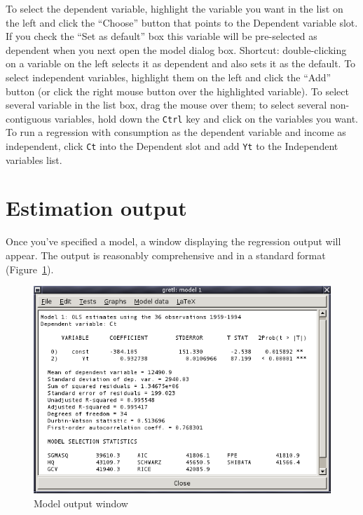 To select the dependent variable, highlight the variable you want in
the list on the left and click the ``Choose'' button that points to
the Dependent variable slot.  If you check the ``Set as default'' box
this variable will be pre-selected as dependent when you next open the
model dialog box. Shortcut: double-clicking on a variable on the left
selects it as dependent and also sets it as the default. To select
independent variables, highlight them on the left and click the
``Add'' button (or click the right mouse button over the highlighted
variable).  To select several variable in the list box, drag the mouse
over them; to select several non-contiguous variables, hold down the
\verb+Ctrl+ key and click on the variables you want.  To run a
regression with consumption as the dependent variable and income as
independent, click \verb+Ct+ into the Dependent slot and add \verb+Yt+
to the Independent variables list.


\section{Estimation output}
\label{est-output}

Once you've specified a model, a window displaying the regression
output will appear.  The output is reasonably comprehensive and in a
standard format (Figure~\ref{fig-modelwin}).
    
\begin{figure}[htbp]
  \begin{center}
    \includegraphics[scale=0.5]{figures/modelwin}
  \end{center}
  \caption{Model output window}
  \label{fig-modelwin}
\end{figure}

